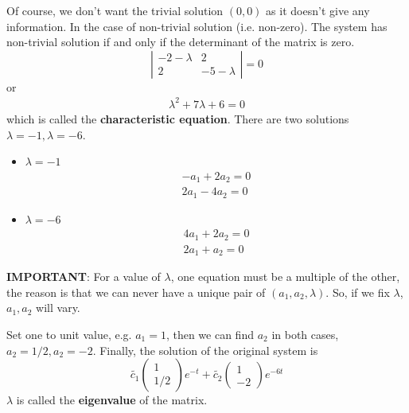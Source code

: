 Of course, we don't want the trivial solution $(0,0)$ as it doesn't
give any information. In the case of non-trivial solution
(i.e. non-zero). The system has non-trivial solution if and only if
the determinant of the matrix is zero.
\begin{equation}
  \label{eq:601}
  \left|
    \begin{array}{cc}
      -2-\lambda & 2 \\
      2& -5-\lambda
    \end{array}
  \right| = 0
\end{equation}
or 
\begin{eqnarray*}
  \lambda^2 + 7\lambda + 6 = 0
\end{eqnarray*}
which is called the {\bf characteristic equation}. There are two
solutions $\lambda=-1, \lambda=-6$. 
\begin{itemize}
\item $\lambda=-1$
  \begin{equation}
    \label{eq:602}
    \begin{split}
      -a_1 + 2a_2 = 0 \\
      2a_1 - 4a_2 = 0
    \end{split}
  \end{equation}
\item $\lambda=-6$
  \begin{equation}
    \label{eq:602}
    \begin{split}
      4a_1 + 2a_2 = 0 \\
      2a_1 + a_2 = 0
    \end{split}
  \end{equation}
\end{itemize}
{\bf IMPORTANT}: For a value of $\lambda$, one equation must be a
multiple of the other, the reason is that we can never have a unique
pair of $(a_1,a_2,\lambda)$. So, if we fix $\lambda$, $a_1,a_2$ will
vary. 

Set one to unit value, e.g. $a_1=1$, then we can find $a_2$ in both
cases, $a_2 = 1/2, a_2 = -2$. Finally, the solution of the original
system is
\begin{equation}
  \label{eq:603}
  \tilde{c_1}   \left(
    \begin{array}{c}
      1 \\ 1/2
    \end{array}
  \right) e^{-t} + \tilde{c_2}  \left(
    \begin{array}{c}
      1 \\ -2
    \end{array}
  \right) e^{-6t}
\end{equation}
$\lambda$ is called the {\bf eigenvalue} of the matrix. 

